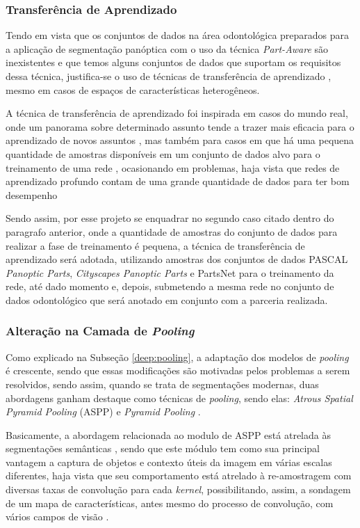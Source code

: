 \subsubsection{Transferência de Aprendizado}
\label{proposal:transf}
Tendo em vista que os conjuntos de dados na área odontológica preparados para a aplicação de segmentação panóptica com o uso da técnica \textit{Part-Aware} são inexistentes e que temos alguns conjuntos de dados que suportam os requisitos dessa técnica, justifica-se o uso de técnicas de transferência de aprendizado \cite{Weiss2016}, mesmo em casos de espaços de características heterogêneos.

A técnica de transferência de aprendizado foi inspirada em casos do mundo real, onde um panorama sobre determinado assunto tende a trazer mais eficacia para o aprendizado de novos assuntos \cite{Pan2010}, mas também para casos em que há uma pequena quantidade de amostras disponíveis em um conjunto de dados alvo para o treinamento de uma rede \cite{Weiss2016}, ocasionando em problemas, haja vista que redes de aprendizado profundo contam de uma grande quantidade de dados para ter bom desempenho \cite{Goodfellow2016}

Sendo assim, por esse projeto se enquadrar no segundo caso citado dentro do paragrafo anterior, onde a quantidade de amostras do conjunto de dados para realizar a fase de treinamento é pequena, a técnica de transferência de aprendizado será adotada, utilizando amostras dos conjuntos de dados PASCAL \textit{Panoptic Parts}, \textit{Cityscapes Panoptic Parts} e PartsNet para o treinamento da rede, até dado momento e, depois, submetendo a mesma rede no conjunto de dados odontológico que será anotado em conjunto com a parceria realizada.


\subsubsection{Alteração na Camada de \textit{Pooling}}
\label{proposal:pcapooling}
Como explicado na Subseção \ref{deep:pooling}, a adaptação dos modelos de \textit{pooling} é crescente, sendo que essas modificações são motivadas pelos problemas a serem resolvidos, sendo assim, quando se trata de segmentações modernas, duas abordagens ganham destaque como técnicas de \textit{pooling}, sendo elas: \textit{Atrous Spatial Pyramid Pooling} (ASPP) \cite{Chen2018} e \textit{Pyramid Pooling} \cite{Zhao2017}.

Basicamente, a abordagem relacionada ao modulo de ASPP está atrelada às segmentações semânticas \cite{Mohan2020}, sendo que este módulo tem como sua principal vantagem a captura de objetos e contexto úteis da imagem em várias escalas diferentes, haja vista que seu comportamento está atrelado à re-amostragem com diversas taxas de convolução para cada \textit{kernel}, possibilitando, assim, a sondagem de um mapa de características, antes mesmo do processo de convolução, com vários campos de visão \cite{Chen2018}.

